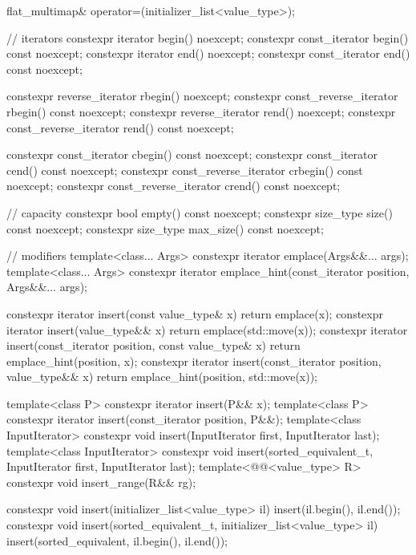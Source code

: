 \begin{codeblock}
{{    flat_multimap& operator=(initializer_list<value_type>);

    // iterators
    constexpr iterator               begin() noexcept;
    constexpr const_iterator         begin() const noexcept;
    constexpr iterator               end() noexcept;
    constexpr const_iterator         end() const noexcept;

    constexpr reverse_iterator       rbegin() noexcept;
    constexpr const_reverse_iterator rbegin() const noexcept;
    constexpr reverse_iterator       rend() noexcept;
    constexpr const_reverse_iterator rend() const noexcept;

    constexpr const_iterator         cbegin() const noexcept;
    constexpr const_iterator         cend() const noexcept;
    constexpr const_reverse_iterator crbegin() const noexcept;
    constexpr const_reverse_iterator crend() const noexcept;

    // capacity
    constexpr bool empty() const noexcept;
    constexpr size_type size() const noexcept;
    constexpr size_type max_size() const noexcept;

    // modifiers
    template<class... Args> constexpr iterator emplace(Args&&... args);
    template<class... Args>
      constexpr iterator emplace_hint(const_iterator position, Args&&... args);

    constexpr iterator insert(const value_type& x)
      { return emplace(x); }
    constexpr iterator insert(value_type&& x)
      { return emplace(std::move(x)); }
    constexpr iterator insert(const_iterator position, const value_type& x)
      { return emplace_hint(position, x); }
    constexpr iterator insert(const_iterator position, value_type&& x)
      { return emplace_hint(position, std::move(x)); }

    template<class P> constexpr iterator insert(P&& x);
    template<class P>
      constexpr iterator insert(const_iterator position, P&&);
    template<class InputIterator>
      constexpr void insert(InputIterator first, InputIterator last);
    template<class InputIterator>
      constexpr void insert(sorted_equivalent_t, InputIterator first, InputIterator last);
    template<@@<value_type> R>
      constexpr void insert_range(R&& rg);

    constexpr void insert(initializer_list<value_type> il)
      { insert(il.begin(), il.end()); }
    constexpr void insert(sorted_equivalent_t, initializer_list<value_type> il)
      { insert(sorted_equivalent, il.begin(), il.end()); }

}}
\end{codeblock}
